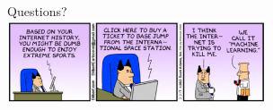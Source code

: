 \documentclass[10pt,mathserif,serif,handout]{beamer}
\begin{document}
\begin{frame}
\begin{center}
\large Questions?\\
\vspace{2em}
\includegraphics[width=3in]{figures/dilbert}
\end{center}
\end{frame}
\end{document}
